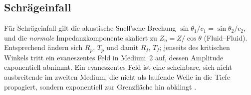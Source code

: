 \subsection{Schräg\-einfall}
Für Schräg\-einfall gilt die akustische Snell'sche Brechung
\(
    \sin\theta_1/c_1=\sin\theta_2/c_2
\),
und die \emph{normale} Impedanzkomponente skaliert zu
$Z_{n} = Z/\cos\theta$ (Fluid--Fluid).
Entsprechend ändern sich $R_p$, $T_p$ und damit $R_I$, $T_I$;
jenseits des kritischen Winkels tritt ein evaneszentes Feld in
Medium~2 auf, dessen Amplitude exponentiell abnimmt.
Ein evaneszentes Feld ist eine scheinbare, sich nicht ausbreitende
im zweiten Medium, die nicht als laufende Welle in die Tiefe propagiert,
sondern exponentiell zur Grenzfläche hin abklingt \cite{schall:wikiSnell}.
\blindtext{}